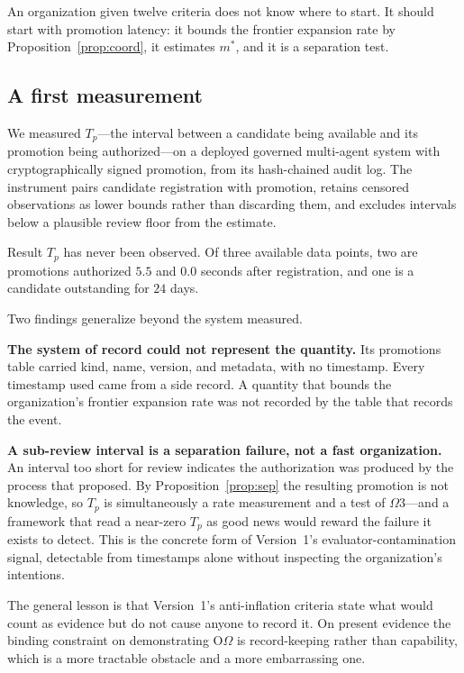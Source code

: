 \documentclass[11pt]{article}
\newcommand{\OOm}{\ensuremath{\mathrm{O}\Omega}}
\newcommand{\Tp}{\ensuremath{T_p}}
\begin{document}
An organization given twelve criteria does not know where to start. It should start with promotion latency: it bounds the frontier expansion rate by Proposition~\ref{prop:coord}, it estimates $m^*$, and it is a separation test.

\subsection{A first measurement}

We measured $\Tp$---the interval between a candidate being available and its promotion being authorized---on a deployed governed multi-agent system with cryptographically signed promotion, from its hash-chained audit log. The instrument pairs candidate registration with promotion, retains censored observations as lower bounds rather than discarding them, and excludes intervals below a plausible review floor from the estimate.

\begin{cautionbox}{Result}
$\Tp$ has never been observed. Of three available data points, two are promotions authorized $5.5$ and $0.0$ seconds after registration, and one is a candidate outstanding for $24$ days.
\end{cautionbox}

Two findings generalize beyond the system measured.

\textbf{The system of record could not represent the quantity.} Its promotions table carried kind, name, version, and metadata, with no timestamp. Every timestamp used came from a side record. A quantity that bounds the organization's frontier expansion rate was not recorded by the table that records the event.

\textbf{A sub-review interval is a separation failure, not a fast organization.} An interval too short for review indicates the authorization was produced by the process that proposed. By Proposition~\ref{prop:sep} the resulting promotion is not knowledge, so $\Tp$ is simultaneously a rate measurement and a test of $\Omega$3---and a framework that read a near-zero $\Tp$ as good news would reward the failure it exists to detect. This is the concrete form of Version~1's evaluator-contamination signal, detectable from timestamps alone without inspecting the organization's intentions.

The general lesson is that Version~1's anti-inflation criteria state what would count as evidence but do not cause anyone to record it. On present evidence the binding constraint on demonstrating \OOm{} is record-keeping rather than capability, which is a more tractable obstacle and a more embarrassing one.
\end{document}
